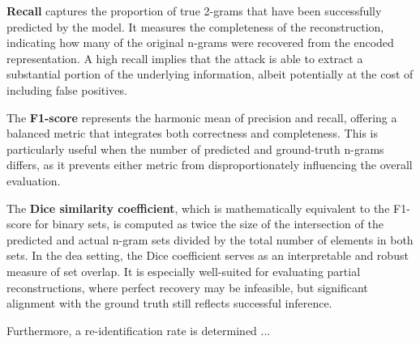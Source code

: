\textbf{Recall} captures the proportion of true 2-grams that have been successfully predicted by the model.
It measures the completeness of the reconstruction, indicating how many of the original n-grams were recovered from the encoded representation.
A high recall implies that the attack is able to extract a substantial portion of the underlying information, albeit potentially at the cost of including false positives.

The \textbf{F1-score} represents the harmonic mean of precision and recall, offering a balanced metric that integrates both correctness and completeness.
This is particularly useful when the number of predicted and ground-truth n-grams differs, as it prevents either metric from disproportionately influencing the overall evaluation.

The \textbf{Dice similarity coefficient}, which is mathematically equivalent to the F1-score for binary sets, is computed as twice the size of the intersection of the predicted and actual n-gram sets divided by the total number of elements in both sets.
In the \ac{dea} setting, the Dice coefficient serves as an interpretable and robust measure of set overlap.
It is especially well-suited for evaluating partial reconstructions, where perfect recovery may be infeasible, but significant alignment with the ground truth still reflects successful inference.


Furthermore, a re-identification rate is determined ... %


